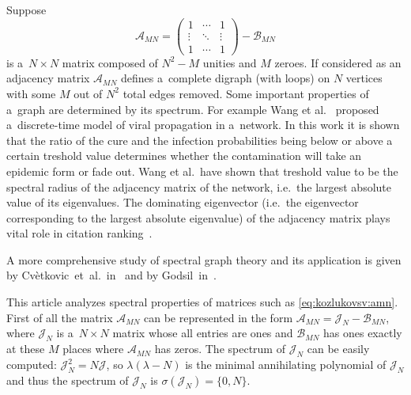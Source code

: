 Suppose
\begin{equation}\label{eq:kozlukovsv:amn}
    \mathscr{A}_{MN} =
    \begin{pmatrix}
        1 & \cdots & 1 \\
        \vdots & \ddots & \vdots \\
        1 & \cdots & 1
    \end{pmatrix} - \mathscr{B}_{MN}
\end{equation}
    is a~\( N\times N \) matrix composed of
    \( N^2 - M \) unities and \( M \) zeroes.
If considered as an adjacency matrix \( \mathscr{A}_{MN} \)
    defines a~complete digraph (with loops) on \( N \) vertices
    with some \( M \) out of \( N^2 \) total edges removed.
Some important properties of a~graph are determined by its spectrum.
For example Wang et al.\ \cite{wang2003epidemic,chakrabarti2008epidemic} proposed a~discrete-time model
    of viral propagation in a~network.
In this work it is shown that the ratio
    of the cure and the infection probabilities
    being below or above a certain treshold value
    determines whether the contamination will take an epidemic form
    or fade out.
Wang et al.\ have shown that treshold value
    to be the spectral radius of the adjacency matrix of the network,
    i.e.\ the largest absolute value of its eigenvalues.
The dominating eigenvector
(i.e.\ the eigenvector corresponding to the largest absolute eigenvalue)
of the adjacency matrix
plays vital role in citation ranking~\cite{bonacich1972factoring,ilprints422}.

A more comprehensive study of spectral graph theory
    and its application is given by Cv\`etkovic~et~al.~in~\cite{cvetkovic1980spectra}
    and by Godsil~in~\cite{godsil2013algebraic}.

This article analyzes spectral properties of matrices such as \eqref{eq:kozlukovsv:amn}.
First of all the matrix \( \mathscr{A}_{MN} \) can be represented in the form
    \( \mathscr{A}_{MN} = \mathcal{J}_N - \mathscr{B}_{MN} \),
    where \( \mathcal{J}_N \) is a~\( N\times N \) matrix
    whose all entries are ones
    and \( \mathcal{B}_{MN} \) has ones exactly at these \( M \)
    places where \( \mathscr{A}_{MN} \) has zeros.
The spectrum of \( \mathcal{J}_N \) can be easily computed:
    \( \mathcal{J}_N^2 = N \mathcal{J} \),
    so \( \lambda(\lambda - N) \) is the minimal
    annihilating polynomial of \( \mathcal{J}_N \)
    and thus the spectrum of \( \mathcal{J}_{N} \) is
    \( \sigma(\mathcal{J}_N) = \{ 0,N \} \).

